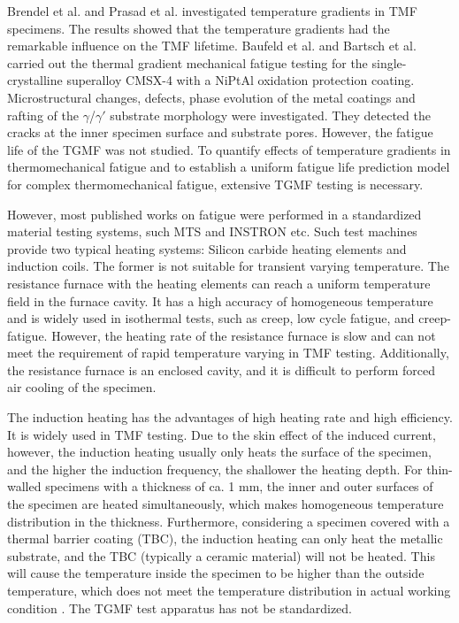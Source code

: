 \documentclass[preprint,5p,twocolumn,10pt,sort&compress]{elsarticle}
\begin{document}
Brendel et al. \cite{BRENDEL2008234} and Prasad et al. \cite{PRASAD2013131} investigated temperature gradients in TMF specimens. The results showed that the temperature gradients had the remarkable influence on the TMF lifetime.
Baufeld et al. \cite{BAUFELD2008219} and Bartsch et al. \cite{BARTSCH2008211} carried out the thermal gradient mechanical fatigue testing for the single-crystalline superalloy CMSX-4 with a NiPtAl oxidation protection coating.
Microstructural changes, defects, phase evolution of the metal coatings and rafting of the $\gamma$/$\gamma'$ substrate morphology were investigated. They detected the cracks at the inner specimen surface and substrate pores. However, the fatigue life of the TGMF was not studied. To quantify effects of temperature gradients in thermomechanical fatigue and to establish a uniform fatigue life prediction model for complex thermomechanical fatigue, extensive TGMF testing is necessary.

However, most published works on fatigue were performed in a standardized material testing systems, such MTS and INSTRON etc. Such test machines provide two typical heating systems: Silicon carbide heating elements and induction coils. The former is not suitable for transient varying temperature. 
The resistance furnace with the heating elements can reach a uniform temperature field in the furnace cavity. It has a high accuracy of homogeneous temperature and is widely used in isothermal tests, such as creep, low cycle fatigue, and creep-fatigue. However, the heating rate of the resistance furnace is slow and can not meet the requirement of rapid temperature varying in TMF testing. Additionally, the resistance furnace is an enclosed cavity, and it is difficult to perform forced air cooling of the specimen.

The induction heating has the advantages of high heating rate and high efficiency. It is widely used in TMF testing.
Due to the skin effect of the induced current, however, the induction heating usually only heats the surface of the specimen, and the higher the induction frequency, the shallower the heating depth. For thin-walled specimens with a thickness of  ca. 1 mm, the inner and outer surfaces of the specimen are heated simultaneously, which makes homogeneous temperature distribution in the thickness. Furthermore, considering a specimen covered with a thermal barrier coating (TBC), the induction heating can only heat the metallic substrate, and the TBC (typically a ceramic material) will not be heated. This will cause the temperature inside the specimen to be higher than the outside temperature, which does not meet the temperature distribution in actual working condition \cite{BRENDEL2008234}.  The TGMF test apparatus has not be standardized. 
\end{document}
